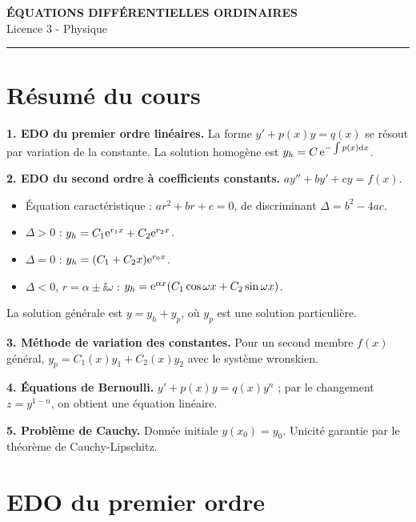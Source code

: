 \documentclass[12pt,a4paper]{article}
\begin{document}
\fi

\begin{center}
  {\LARGE\bfseries ÉQUATIONS DIFFÉRENTIELLES ORDINAIRES}\\[0.3cm]
  {\normalsize Licence 3 - Physique}\\[0.1cm]
  \rule{0.7\textwidth}{0.8pt}
\end{center}

\section*{Résumé du cours}

\begin{boiteresume}

\textbf{1. EDO du premier ordre linéaires.} La forme $y' + p(x)y = q(x)$ se résout par variation de la constante. La solution homogène est $y_h = C\,\mathrm{e}^{-\int p(x)\mathrm{d} x}$.

\textbf{2. EDO du second ordre à coefficients constants.} $ay'' + by' + cy = f(x)$.
\begin{itemize}[nosep]
  \item Équation caractéristique : $ar^2 + br + c = 0$, de discriminant $\Delta = b^2-4ac$.
  \item $\Delta > 0$ : $y_h = C_1\mathrm{e}^{r_1 x} + C_2\mathrm{e}^{r_2 x}$.
  \item $\Delta = 0$ : $y_h = (C_1 + C_2 x)\mathrm{e}^{r_0 x}$.
  \item $\Delta < 0$, $r = \alpha\pm\ii\omega$ : $y_h = \mathrm{e}^{\alpha x}(C_1\cos\omega x + C_2\sin\omega x)$.
\end{itemize}
La solution générale est $y = y_h + y_p$, où $y_p$ est une solution particulière.

\textbf{3. Méthode de variation des constantes.} Pour un second membre $f(x)$ général, $y_p = C_1(x)y_1 + C_2(x)y_2$ avec le système wronskien.

\textbf{4. Équations de Bernoulli.} $y' + p(x)y = q(x)y^n$ ; par le changement $z = y^{1-n}$, on obtient une équation linéaire.

\textbf{5. Problème de Cauchy.} Donnée initiale $y(x_0) = y_0$. Unicité garantie par le théorème de Cauchy-Lipschitz.

\end{boiteresume}

\newpage
\section{EDO du premier ordre}
\end{document}

